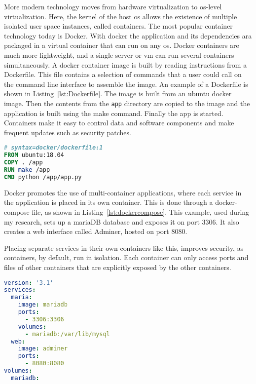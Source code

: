 More modern technology moves from hardware virtualization to \gls{os}-level virtualization.
Here, the kernel of the host \gls{os} allows the existence of multiple isolated user space instances, called containers.
The most popular container technology today is Docker.
With docker the application and its dependencies ara packaged in a virtual container that can run on any \gls{os}.
Docker containers are much more lightweight, and a single server or \gls{vm} can run several containers simultaneously.
A docker container image is built by reading instructions from a Dockerfile.
This file contains a selection of commands that a user could call on the command line interface to assemble the image.
An example of a Dockerfile is shown in Listing~\ref{lst:Dockerfile}.
The image is built from an ubuntu docker image. Then the contents from the \texttt{app} directory are copied to the image and the application is built using the make command. Finally the app is started.
Containers make it easy to control data and software components and make frequent updates such as security patches.

\begin{lstlisting}[language={Dockerfile},caption={Example of a Dockerfile to build and run a Python application.},label={lst:Dockerfile},xleftmargin=15pt]
# syntax=docker/dockerfile:1
FROM ubuntu:18.04
COPY . /app
RUN make /app
CMD python /app/app.py
\end{lstlisting}

Docker promotes the use of multi-container applications, where each service in the application is placed in its own container.
This is done through a docker-compose file, as shown in Listing~\ref{lst:dockercompose}.
This example, used during my research, sets up a mariaDB database and exposes it on port 3306. It also creates a web interface called Adminer, hosted on port 8080.

Placing separate services in their own containers like this, improves security, as containers, by default, run in isolation.
Each container can only access ports and files of other containers that are explicitly exposed by the other containers.

\begin{minipage}[t]{0.9\linewidth}
\begin{lstlisting}[language={YAML},caption={Example of a Dockerfile to build and run a Python application.},label={lst:dockercompose},xleftmargin=15pt]
version: '3.1'
services:
  maria:
    image: mariadb
    ports:
      - 3306:3306
    volumes:
      - mariadb:/var/lib/mysql
  web:
    image: adminer
    ports:
      - 8080:8080
volumes:
  mariadb:

\end{lstlisting}
\end{minipage}

